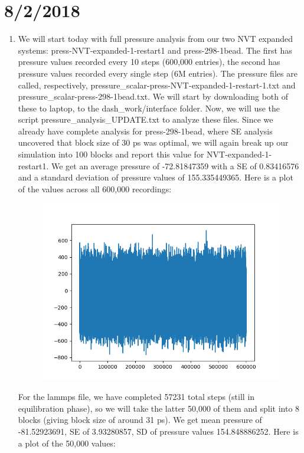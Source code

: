 \documentclass[12pt,reqno]{amsart}
\numberwithin{equation}{section}
\begin{document}
\section{8/2/2018}
\begin{enumerate}
\item We will start today with full pressure analysis from our two NVT expanded systems: press-NVT-expanded-1-restart1 and press-298-1bead.  The first has pressure values recorded every 10 steps (600,000 entries), the second has pressure values recorded every single step (6M entries).   The pressure files are called, respectively, pressure\_scalar-press-NVT-expanded-1-restart-1.txt and pressure\_scalar-press-298-1bead.txt.  We will start by downloading both of these to laptop, to the dash\_work/interface folder.  Now, we will use the script pressure\_analysis\_UPDATE.txt to analyze these files.  Since we already have complete analysis for press-298-1bead, where SE analysis uncovered that block size of 30 ps was optimal, we will again break up our simulation into 100 blocks and report this value for NVT-expanded-1-restart1.  We get an average pressure of -72.81847359 with a SE of 0.83416576 and a standard deviation of pressure values of 155.335449365.  Here is a plot of the values across all 600,000 recordings:
\begin{figure}[H]
\centering
\includegraphics[scale=0.6]{pressures_press-NVT-expanded-1-restart1}
\end{figure}
For the lammps file, we have completed 57231 total steps (still in equilibration phase), so we will take the latter 50,000 of them and split into 8 blocks (giving block size of around 31 ps).  We get mean pressure of -81.52923691, SE of 3.93280857, SD of pressure values 154.848886252.  Here is a plot of the 50,000 values:

\end{enumerate}
\end{document}
